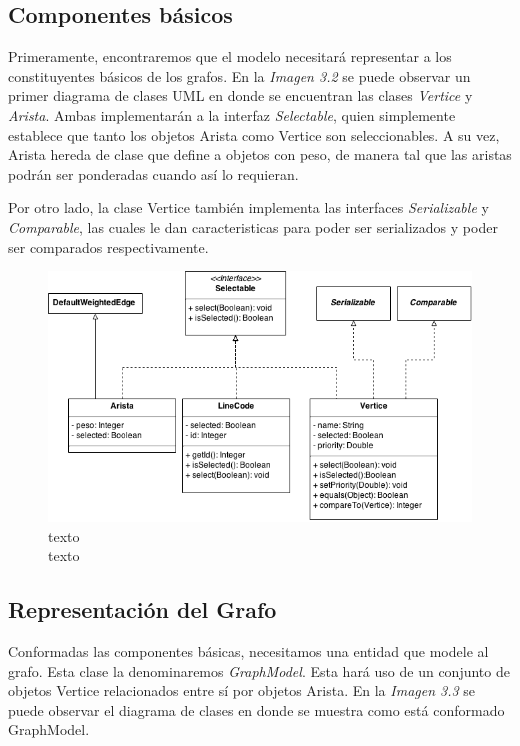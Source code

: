 \documentclass{book}
\begin{document}
\subsection{Componentes básicos}

	Primeramente, encontraremos que el modelo necesitará representar a los constituyentes básicos de los grafos. En la \textit{Imagen 3.2} se puede observar un primer diagrama de clases UML en donde se encuentran las clases \textit{Vertice} y \textit{Arista}. Ambas implementarán a la interfaz \textit{Selectable}, quien simplemente establece que tanto los objetos Arista como Vertice son seleccionables. A su vez, Arista hereda de clase que define a objetos con peso, de manera tal que las aristas podrán ser ponderadas cuando así lo requieran.
	\par
	Por otro lado, la clase Vertice también implementa las interfaces \textit{Serializable} y \textit{Comparable}, las cuales le dan caracteristicas para poder ser serializados y poder ser comparados respectivamente.
	\bigskip\bigskip


\begin{figure}[H]
	\centering
	\includegraphics[width=1\textwidth]{images/01-01.png}
	\medskip
	\caption{texto \\ texto}
	\medskip
\end{figure}
\medskip



\subsection{Representación del Grafo}

	Conformadas las componentes básicas, necesitamos una entidad que modele al grafo. Esta clase la denominaremos \textit{GraphModel}. Esta hará uso de un conjunto de objetos Vertice relacionados entre sí por objetos Arista. En la \textit{Imagen 3.3} se puede observar el diagrama de clases en donde se muestra como está conformado GraphModel.
\end{document}
